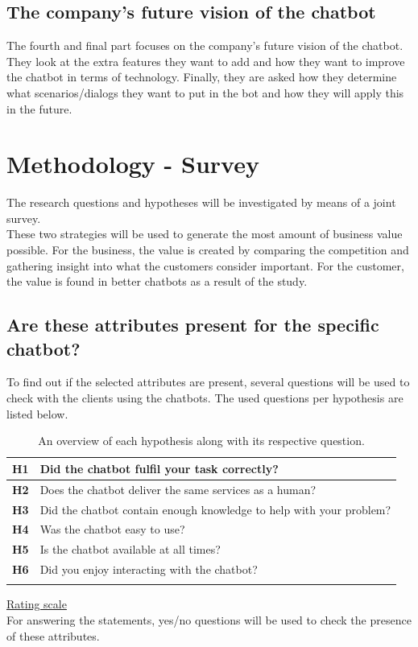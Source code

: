 \subsection{The company's future vision of the chatbot}
The fourth and final part focuses on the company's future vision of the chatbot. They look at the extra features they want to add and how they want to improve the chatbot in terms of technology. Finally, they are asked how they determine what scenarios/dialogs they want to put in the bot and how they will apply this in the future.

\section{Methodology - Survey}
The research questions and hypotheses will be investigated by means of a joint survey.\\
\break
These two strategies will be used to generate the most amount of business value possible. For the business, the value is created by comparing the competition and gathering insight into what the customers consider important. For the customer, the value is found in better chatbots as a result of the study.\\

\subsection{Are these attributes present for the specific chatbot?}
To find out if the selected attributes are present, several questions will be used to check with the clients using the chatbots. The used questions per hypothesis are listed below.

\begin{longtable}{|l|l|}
	\hline
	\textbf{H1} & Did the chatbot fulfil your task correctly?                         \\ \hline
	\endfirsthead
	\endhead
	\textbf{H2} & Does the chatbot deliver the same services as a human?              \\ \hline
	\textbf{H3} & Did the chatbot contain enough knowledge to help with your problem? \\ \hline
	\textbf{H4} & Was the chatbot easy to use?                                        \\ \hline
	\textbf{H5} & Is the chatbot available at all times?                              \\ \hline
	\textbf{H6} & Did you enjoy interacting with the chatbot?                         \\ \hline
	\caption{An overview of each hypothesis along with its respective question.}
	\label{tab:YNOverview}
\end{longtable}
\ul{Rating scale}\\
For answering the statements, yes/no questions will be used to check the presence of these attributes.

